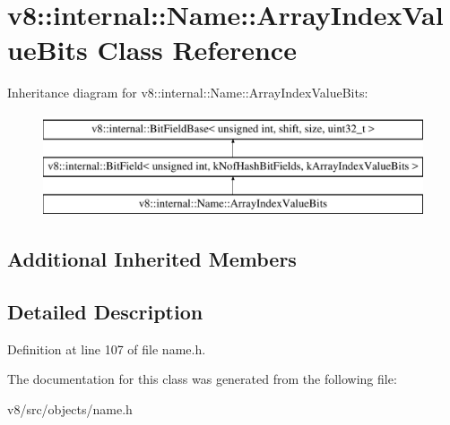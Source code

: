 \hypertarget{classv8_1_1internal_1_1Name_1_1ArrayIndexValueBits}{}\section{v8\+:\+:internal\+:\+:Name\+:\+:Array\+Index\+Value\+Bits Class Reference}
\label{classv8_1_1internal_1_1Name_1_1ArrayIndexValueBits}
Inheritance diagram for v8\+:\+:internal\+:\+:Name\+:\+:Array\+Index\+Value\+Bits\+:\begin{figure}[H]
\begin{center}
\leavevmode
\includegraphics[height=3.000000cm]{classv8_1_1internal_1_1Name_1_1ArrayIndexValueBits}
\end{center}
\end{figure}
\subsection*{Additional Inherited Members}


\subsection{Detailed Description}


Definition at line 107 of file name.\+h.



The documentation for this class was generated from the following file\+:\begin{DoxyCompactItemize}
\item 
v8/src/objects/name.\+h\end{DoxyCompactItemize}
